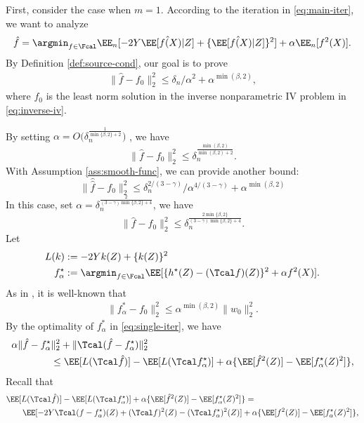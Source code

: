 \documentclass[12pt]{extarticle} %
\begin{document}
First, consider the case when $m=1$. According to the iteration in \eqref{eq:main-iter}, we want to analyze 
\begin{align}\label{eq:single-iter}
         \hat f  =\argmin_{f \in \Fcal} 
       \EE_n[ - 2 Y \hat \EE[f(X)|Z] +  \{\hat \EE[f(X)|Z]\}^2  ]   
         +\alpha \EE_n[f^2(X)]. 
    \end{align}
By Definition \ref{def:source-cond}, our goal is to prove 
\begin{align*}
    \|\hat f-f_0 \|^2_2\leq  \delta_n / \alpha^2+ \alpha^{\min(\beta,2)},
\end{align*}
where $f_0$ is the least norm solution in the inverse nonparametric IV problem in  \eqref{eq:inverse-iv}. 

By setting $\alpha = O\big(\delta_n^{\frac{1}{\min\{\beta, 2\}+2}}\big)$ , we have $$
\|\hat{f} - f_0 \|_2^2 \leq \delta_n^{\frac{\min(\beta,2)}{\min(\beta,2) + 2}}.
$$
With Assumption \ref{ass:smooth-func}, we can provide another bound: $$
    \|\hat \hat{f}-f_0 \|^2_2\leq  \delta_n^{2/(3-\gamma)} / \alpha^{4 / (3-\gamma)} + \alpha^{\min(\beta,2)}
$$
In this case, set $\alpha = \delta_n^{\frac{2}{(3-\gamma)\min\{\beta, 2\}+4}}$, we have $$
\|\hat{f} - f_0\|_2^2 \leq \delta_n^{\frac{2\min\{\beta,2\}}{(3-\gamma)\min\{\beta, 2\}+4}}.
$$
Let 
\begin{align}\label{eq:defs}
    L(k) &:=  - 2 Y k(Z) +  \{k(Z)\}^2  \\
    f^{\star}_{\alpha} &:= \argmin_{f\in\Fcal} \EE[\{h^{\star}(Z)  - (\Tcal f)(Z) \}^2 +\alpha f^2(X) ]\nonumber. 
\end{align}
As in \citet{LiaoLuofeng2020PENE}, it is well-known that 
\begin{align*}
    \|f^{*}_{\alpha}-f_0\|^2_2 \leq \alpha^{\min(\beta,2)} \|w_0\|_2^2. 
\end{align*}
By the optimality of $f_\alpha^*$ in \eqref{eq:single-iter}, we have 
\begin{align*}
    & \alpha \|\hat{f} - f^{\star}_{\alpha} \|^2_2 + \|\Tcal(\hat{f}-f^{\star}_{\alpha})\|^2_2  \\
    &\qquad\qquad\leq \EE[L(\Tcal \hat{f}) ] - \EE[L (\Tcal f^{\star}_{\alpha})] + \alpha\{\EE[\hat{f}^2(Z)] - \EE[f^{\star}_{\alpha}(Z)^2]\},
\end{align*}
Recall that \begin{align*}
    &\EE[L(\Tcal \hat{f}) ] - \EE[L (\Tcal f^{\star}_{\alpha})] + \alpha\{\EE[\hat{f}^2(Z)] - \EE[f^{\star}_{\alpha}(Z)^2]\} =\\
    &\qquad\EE[ - 2 Y  \Tcal (f-f^{\star}_{\alpha})(Z)  + (\Tcal f)^2(Z) -  (\Tcal f^{\star}_{\alpha})^2(Z) ] +  \alpha\{\EE[f^2(Z)] - \EE[f^{\star}_{\alpha}(Z)^2]\},
\end{align*}
\end{document}
